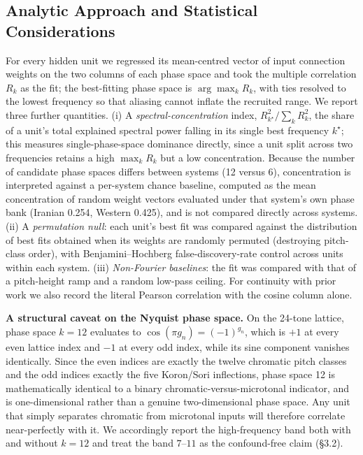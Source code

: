 \documentclass[pdflatex,sn-nature]{sn-jnl}
\newcommand{\num}[1]{#1}
\begin{document}
\subsection{Analytic Approach and Statistical Considerations}
For every hidden unit we regressed its mean-centred vector of input connection weights on
the two columns of each phase space and took the multiple correlation $R_k$ as the fit; the
best-fitting phase space is $\arg\max_k R_k$, with ties resolved to the lowest frequency so
that aliasing cannot inflate the recruited range. We report three further quantities. (i) A
\emph{spectral-concentration} index, $R_{k^\star}^2/\sum_k R_k^2$, the share of a unit's
total explained spectral power falling in its single best frequency $k^\star$; this measures
single-phase-space dominance directly, since a unit split across two frequencies retains a
high $\max_k R_k$ but a low concentration. Because the number of candidate phase spaces
differs between systems (12 versus 6), concentration is interpreted against a per-system
chance baseline, computed as the mean concentration of random weight vectors evaluated
under that system's own phase bank (Iranian \num{0.254}, Western \num{0.425}), and is not
compared directly across systems. (ii) A \emph{permutation null}: each unit's best fit was
compared against the distribution of best fits obtained when its weights are randomly
permuted (destroying pitch-class order), with Benjamini--Hochberg false-discovery-rate
control across units within each system. (iii) \emph{Non-Fourier baselines}: the fit was
compared with that of a pitch-height ramp and a random low-pass ceiling. For continuity with
prior work we also record the literal Pearson correlation with the cosine column alone.

\textbf{A structural caveat on the Nyquist phase space.} On the 24-tone lattice, phase
space $k=12$ evaluates to $\cos(\pi g_n)=(-1)^{g_n}$, which is $+1$ at every even lattice
index and $-1$ at every odd index, while its sine component vanishes identically. Since the
even indices are exactly the twelve chromatic pitch classes and the odd indices exactly the
five Koron/Sori inflections, phase space 12 is mathematically identical to a binary
chromatic-versus-microtonal indicator, and is one-dimensional rather than a genuine
two-dimensional phase space. Any unit that simply separates chromatic from microtonal inputs
will therefore correlate near-perfectly with it. We accordingly report the high-frequency
band both with and without $k=12$ and treat the band $7$--$11$ as the confound-free claim
(\S3.2).
\end{document}
